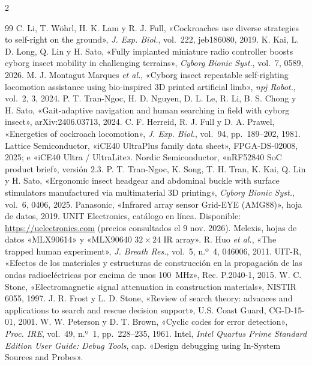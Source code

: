 \begin{multicols}{2}
\begin{thebibliography}{99}
 C. Li, T. Wöhrl, H. K. Lam y R. J. Full, «Cockroaches use diverse strategies to self-right on the ground», \textit{J. Exp. Biol.}, vol.~222, jeb186080, 2019.
 K. Kai, L. D. Long, Q. Lin y H. Sato, «Fully implanted miniature radio controller boosts cyborg insect mobility in challenging terrains», \textit{Cyborg Bionic Syst.}, vol.~7, 0589, 2026.
 M. J. Montagut Marques \textit{et al.}, «Cyborg insect repeatable self-righting locomotion assistance using bio-inspired 3D printed artificial limb», \textit{npj Robot.}, vol.~2, 3, 2024.
 P. T. Tran-Ngoc, H. D. Nguyen, D. L. Le, R. Li, B. S. Chong y H. Sato, «Gait-adaptive navigation and human searching in field with cyborg insect», arXiv:2406.03713, 2024.
 C. F. Herreid, R. J. Full y D. A. Prawel, «Energetics of cockroach locomotion», \textit{J. Exp. Biol.}, vol.~94, pp.~189--202, 1981.
 Lattice Semiconductor, «iCE40 UltraPlus family data sheet», FPGA-DS-02008, 2025; e «iCE40 Ultra / UltraLite».
 Nordic Semiconductor, «nRF52840 SoC product brief», versión 2.3.
 P. T. Tran-Ngoc, K. Song, T. H. Tran, K. Kai, Q. Lin y H. Sato, «Ergonomic insect headgear and abdominal buckle with surface stimulators manufactured via multimaterial 3D printing», \textit{Cyborg Bionic Syst.}, vol.~6, 0406, 2025.
 Panasonic, «Infrared array sensor Grid-EYE (AMG88)», hoja de datos, 2019.
 UNIT Electronics, catálogo en línea. Disponible: \url{https://uelectronics.com} (precios consultados el 9 nov. 2026).
 Melexis, hojas de datos «MLX90614» y «MLX90640 $32\times24$ IR array».
 R. Huo \textit{et al.}, «The trapped human experiment», \textit{J. Breath Res.}, vol.~5, n.º~4, 046006, 2011.
 UIT-R, «Efectos de los materiales y estructuras de construcción en la propagación de las ondas radioeléctricas por encima de unos 100~MHz», Rec. P.2040-1, 2015.
 W. C. Stone, «Electromagnetic signal attenuation in construction materials», NISTIR 6055, 1997.
 J. R. Frost y L. D. Stone, «Review of search theory: advances and applications to search and rescue decision support», U.S. Coast Guard, CG-D-15-01, 2001.
 W. W. Peterson y D. T. Brown, «Cyclic codes for error detection», \textit{Proc. IRE}, vol.~49, n.º~1, pp.~228--235, 1961.
 Intel, \textit{Intel Quartus Prime Standard Edition User Guide: Debug Tools}, cap. «Design debugging using In-System Sources and Probes».

\end{thebibliography}
\end{multicols}
